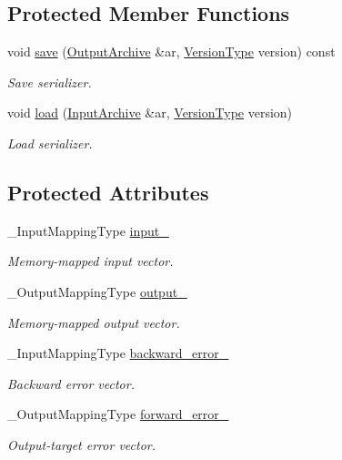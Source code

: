 \subsection*{Protected Member Functions}
\begin{DoxyCompactItemize}
\item 
void \hyperlink{classffnn_1_1layer_1_1_hidden_a98305185267a0f7953f1b53c4bce4cf6}{save} (\hyperlink{classffnn_1_1traits_1_1_serializable_a08d986df75d363fa79506d4f6045cb9f}{Output\-Archive} \&ar, \hyperlink{classffnn_1_1traits_1_1_serializable_a08924b3b7d20cb3cb6eafe517d4f7b30}{Version\-Type} version) const 
\begin{DoxyCompactList}\small\item\em Save serializer. \end{DoxyCompactList}\item 
void \hyperlink{classffnn_1_1layer_1_1_hidden_a696f61b2d9b661b7a8d6bdb3dc32b536}{load} (\hyperlink{classffnn_1_1traits_1_1_serializable_a6e626759259f8f370dd4303b4441a234}{Input\-Archive} \&ar, \hyperlink{classffnn_1_1traits_1_1_serializable_a08924b3b7d20cb3cb6eafe517d4f7b30}{Version\-Type} version)
\begin{DoxyCompactList}\small\item\em Load serializer. \end{DoxyCompactList}\end{DoxyCompactItemize}
\subsection*{Protected Attributes}
\begin{DoxyCompactItemize}
\item 
\-\_\-\-Input\-Mapping\-Type \hyperlink{classffnn_1_1layer_1_1_hidden_aec535cd632fce55d43fc91b04b95c836}{input\-\_\-}
\begin{DoxyCompactList}\small\item\em Memory-\/mapped input vector. \end{DoxyCompactList}\item 
\-\_\-\-Output\-Mapping\-Type \hyperlink{classffnn_1_1layer_1_1_hidden_a69245e9b3e1e9728ab12c69abf142bab}{output\-\_\-}
\begin{DoxyCompactList}\small\item\em Memory-\/mapped output vector. \end{DoxyCompactList}\item 
\-\_\-\-Input\-Mapping\-Type \hyperlink{classffnn_1_1layer_1_1_hidden_a4d615b2812b0c170e213a0b946d41e91}{backward\-\_\-error\-\_\-}
\begin{DoxyCompactList}\small\item\em Backward error vector. \end{DoxyCompactList}\item 
\-\_\-\-Output\-Mapping\-Type \hyperlink{classffnn_1_1layer_1_1_hidden_ae1671dbf7f91d9ae21d307761c0e930e}{forward\-\_\-error\-\_\-}
\begin{DoxyCompactList}\small\item\em Output-\/target error vector. \end{DoxyCompactList}\end{DoxyCompactItemize}


